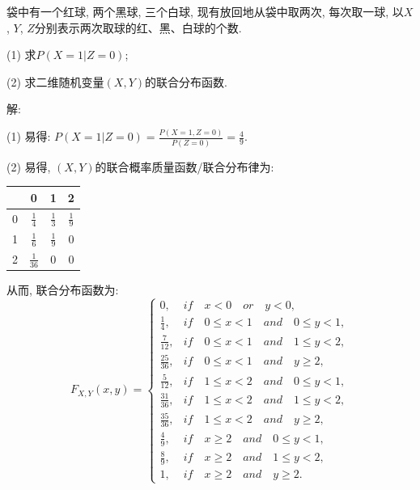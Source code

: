 \documentclass[standard]{ExBook}
\begin{document}
\begin{qitems}
\vspace{-5em}

    \begin{bbox}
    \begin{shaded}
        \qitem
袋中有一个红球, 两个黑球, 三个白球, 现有放回地从袋中取两次, 每次取一球, 以$X$, $Y$, $Z$分别表示两次取球的红、黑、白球的个数.

(1) 求$P(X = 1 | Z = 0)$;

(2) 求二维随机变量$(X,Y)$的联合分布函数.
    \end{shaded}
    \end{bbox}

\vspace{-5em}

    \begin{bbox}
解: 

(1) 易得: $P(X=1|Z=0)=\frac{P(X=1,Z=0)}{P(Z=0)}=\frac{4}{9}$.
    \end{bbox}

\vspace{-5em}

    \begin{bbox}
(2) 易得, $(X,Y)$的联合概率质量函数/联合分布律为:
\begin{footnotesize}
\begin{center}
    \renewcommand{\arraystretch}{1.5}
    \setlength{\tabcolsep}{25pt}
    \begin{tabular}{c|c|c|c}
	    \hline
	    \diagbox{$X$}{$P(X,Y)$}{$Y$} & 0 & 1 & 2 \\
	    \hline
	    0 & $\displaystyle\frac{1}{4}$ & $\displaystyle\frac{1}{3}$ & $\displaystyle\frac{1}{9}$\\
	    \hline
	    1 & $\displaystyle\frac{1}{6}$ & $\displaystyle\frac{1}{9}$ & 0\\
	    \hline
        2 & $\displaystyle\frac{1}{36}$ & 0 & 0 \\
        \hline
    \end{tabular}
\end{center}
\end{footnotesize}
从而, 联合分布函数为:
\[
F_{X,Y}(x, y) = 
\begin{cases} 
0, & if\quad x < 0\quad or\quad y < 0, \\
\frac{1}{4}, & if\quad 0 \leq x < 1\quad and\quad 0 \leq y < 1, \\
\frac{7}{12}, & if\quad 0 \leq x < 1\quad and\quad 1 \leq y < 2, \\
\frac{25}{36}, & if\quad 0 \leq x < 1\quad and\quad y \geq 2, \\
\frac{5}{12}, & if\quad 1 \leq x < 2\quad and\quad 0 \leq y < 1, \\
\frac{31}{36}, & if\quad 1 \leq x < 2\quad and\quad 1 \leq y < 2, \\
\frac{35}{36}, & if\quad 1 \leq x < 2\quad and\quad y \geq 2, \\
\frac{4}{9}, & if\quad x \geq 2\quad and\quad 0 \leq y < 1, \\
\frac{8}{9}, & if\quad x \geq 2\quad and\quad 1 \leq y < 2, \\
1, & if\quad x \geq 2\quad and\quad y \geq 2.
\end{cases}
\]
    \end{bbox}


\end{qitems}
\end{document}
